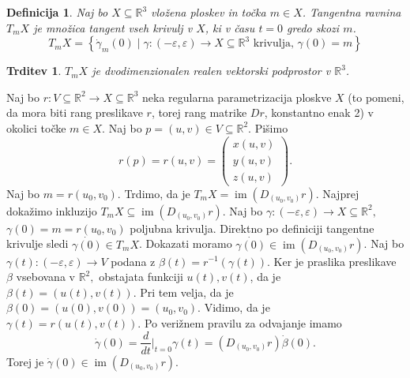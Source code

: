 \documentclass[10pt, a4paper]{article}
\newtheorem{trditev}[izr]{Trditev}
\newtheorem{defi}[izr]{Definicija}
\newenvironment{noticeB}{%
  \tcolorbox[%
  notitle,
  empty,
  enhanced,  %
  breakable,
  coltext=black,
  colback=white, 
  fontupper=\rmfamily,
  noparskip,
  sharp corners,
  boxrule=-1pt,  %
  frame hidden,
  left=7pt,  %
  right=7pt,
  top=5pt,
  bottom=5pt,
  before skip=2.5ex plus 2pt,
  after skip=2.5ex plus 2pt,
  borderline west = {1.5pt}{-0.1pt}{blue!30!black}, %
  overlay unbroken and last={%
    \draw[color=black, line width=1.25pt]
    ($(frame.south west)+(1.pt, -0.1pt)$) -- ++(2em, 0);
  }
  ]}
{\endtcolorbox}
\newenvironment{definicija}{\begin{noticeB}\begin{defi}}{%
\end{defi}\end{noticeB}}
\begin{document}
\begin{definicija} 
	\label{def_tangentna_ravnina}
	Naj bo $X \subseteq \mathbb{R}^3$ vložena ploskev in točka $m
\in X$. Tangentna ravnina $T_mX$ je množica tangent
vseh krivulj v $X$, ki v času $t = 0$ gredo skozi $m$.
\[ T_mX = \left\{ \dot{\gamma}_m\left( 0 \right) \mid
\gamma : \left(  - \varepsilon, \varepsilon \right)
\to  X \subseteq  \mathbb{R}^3 \text{ krivulja, } \gamma\left(
0 \right) = m\right\} \]
\end{definicija}


\begin{trditev}
\label{trd_tangentna_ravnina_je_dvodimenzionalen_vektorski_prostor}
$T_mX$ je dvodimenzionalen realen vektorski podprostor v
$\mathbb{R}^3$. \end{trditev}  Naj bo $r : V
\subseteq  \mathbb{R}^2 \to X \subseteq \mathbb{R}^3$ neka regularna
parametrizacija ploskve $X$ (to pomeni, da mora biti rang preslikave $r$, torej
rang matrike $Dr$, konstantno enak 2) v okolici točke  $m \in  X$. Naj
bo $p = \left( u, v \right) \in  V \subseteq \mathbb{R}^2.$ Pišimo \[ r\left(
p \right) = r\left( u,v \right) = \begin{pmatrix} x\left( u,v
\right) \\ y\left( u,v \right) \\ z\left( u,v \right)
\end{pmatrix} . \] Naj bo $m = r\left( u_0, v_0 \right).$ Trdimo, da
je $ T_mX = \operatorname{im} \left( D_{(u_0, v_0)}r \right) $.
Najprej dokažimo inkluzijo $T_mX \subseteq \operatorname{im} \left(
D_{(u_0, v_0)}r \right)$. 
Naj bo $\gamma: \left( -\varepsilon,
\varepsilon \right) \to X \subseteq \mathbb{R}^2,$ $\gamma \left( 0
\right) = m = r\left( u_0, v_0 \right)$ poljubna krivulja. Direktno
po definiciji tangentne krivulje sledi $\dot{\gamma\left( 0 \right)}
\in T_mX$. 
Dokazati moramo $\dot{\gamma(0)} \in
\operatorname{im}\left(D_\left( u_0, v_0 \right)r  \right)$. Naj bo
$\gamma\left( t \right) : \left( -\varepsilon, \varepsilon \right)\to
V$ podana z $\beta\left( t \right) = r^{-1}\left( \gamma\left( t
\right) \right)$. Ker je praslika preslikave $\beta$ vsebovana v
$\mathbb{R}^2,$ obstajata funkciji $u\left( t \right), v\left( t
\right)$, da je $\beta\left( t \right) = \left( u(t), v(t) \right).$
Pri tem velja, da je $\beta(0) = (u(0), v(0)) = (u_0, v_0).$ Vidimo,
da je $\gamma(t) = r(u(t), v(t)).$ Po verižnem pravilu za odvajanje
imamo \[ \dot{\gamma }(0)= \frac{d}{dt} \big|_{t = 0} \gamma(t) =
\left( D_{ (u_0, v_0)}r \right) \dot{\beta} (0).\]Torej je
$\dot{\gamma} (0) \in \operatorname{im} \left( D_{(u_0,v_0)}r
\right).$ 
\end{document}
